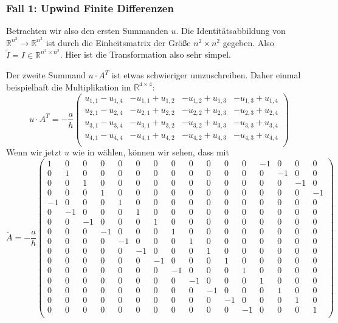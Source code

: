 \documentclass[12pt,a4paper]{scrartcl}
\numberwithin{equation}{section} %
\theoremstyle{definition}
\theoremstyle{plain}
\newcommand{\rr}{\mathbb{R}}
\begin{document}
\subsubsection{Fall 1: Upwind Finite Differenzen}
Betrachten wir also den ersten Summanden $u$. Die Identitätsabbildung von $\rr^{n^2}\to\rr^{n^2}$ ist durch die Einheitsmatrix der Größe $n^2\times n^2$ gegeben. Also $\tilde{I}=I\in\rr^{n^2\times n^2}$. Hier ist die Transformation also sehr simpel.\par Der zweite Summand $u\cdot A^T$ ist etwas schwieriger umzuschreiben. Daher einmal beispielhaft die Multiplikation im $\rr^{4\times 4}$:
\begin{equation}
\label{eq:zweitSum}
u\cdot A^T=-\frac{a}{h}\begin{pmatrix}
u_{1,1}-u_{1,4}&-u_{1,1}+u_{1,2}&-u_{1,2}+u_{1,3}&-u_{1,3}+u_{1,4}\\u_{2,1}-u_{2,4}&-u_{2,1}+u_{2,2}&-u_{2,2}+u_{2,3}&-u_{2,3}+u_{2,4}\\u_{3,1}-u_{3,4}&-u_{3,1}+u_{3,2}&-u_{3,2}+u_{3,3}&-u_{3,3}+u_{3,4}\\u_{4,1}-u_{4,4}&-u_{4,1}+u_{4,2}&-u_{4,2}+u_{4,3}&-u_{4,3}+u_{4,4}\\
\end{pmatrix}
\end{equation}
Wenn wir jetzt $u$ wie in  wählen, können wir sehen, dass mit \setcounter{MaxMatrixCols}{20}
\begin{equation}
\tilde{A}=-\frac{a}{h}\begin{pmatrix}
1&0&0&0&0&0&0&0&0&0&0&0&-1&0&0&0\\
0&1&0&0&0&0&0&0&0&0&0&0&0&-1&0&0\\
0&0&1&0&0&0&0&0&0&0&0&0&0&0&-1&0\\
0&0&0&1&0&0&0&0&0&0&0&0&0&0&0&-1\\
-1&0&0&0&1&0&0&0&0&0&0&0&0&0&0&0\\
0&-1&0&0&0&1&0&0&0&0&0&0&0&0&0&0\\
0&0&-1&0&0&0&1&0&0&0&0&0&0&0&0&0\\
0&0&0&-1&0&0&0&1&0&0&0&0&0&0&0&0\\
0&0&0&0&-1&0&0&0&1&0&0&0&0&0&0&0\\
0&0&0&0&0&-1&0&0&0&1&0&0&0&0&0&0\\
0&0&0&0&0&0&-1&0&0&0&1&0&0&0&0&0\\
0&0&0&0&0&0&0&-1&0&0&0&1&0&0&0&0\\
0&0&0&0&0&0&0&0&-1&0&0&0&1&0&0&0\\
0&0&0&0&0&0&0&0&0&-1&0&0&0&1&0&0\\
0&0&0&0&0&0&0&0&0&0&-1&0&0&0&1&0\\
0&0&0&0&0&0&0&0&0&0&0&-1&0&0&0&1\\
\end{pmatrix}
\end{equation}
\end{document}
